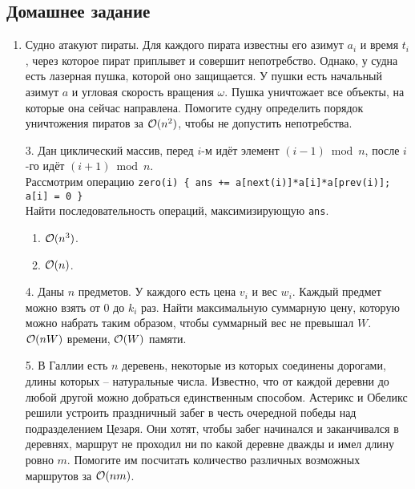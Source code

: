 \subsection{Домашнее задание}
\begin{enumerate}
  \item {}
    Судно атакуют пираты. Для каждого пирата известны его азимут $a_i$
    и время $t_i$, через которое пират приплывет и совершит
    непотребство. Однако, у судна есть лазерная пушка, которой оно
    защищается. У пушки есть начальный азимут $a$ и угловая скорость
    вращения $\omega$. Пушка уничтожает все объекты, на которые она
    сейчас направлена. Помогите судну определить порядок уничтожения
    пиратов за $\mathcal{O}(n^2)$, чтобы не допустить непотребства.


  \item[3.]
    Дан циклический массив, перед $i$-м идёт элемент $(i{-}1) \bmod n$,
    после $i$-го идёт $(i{+}1) \bmod n$. \\
    Рассмотрим операцию \texttt{zero(i) \{ ans += a[next(i)]*a[i]*a[prev(i)]; a[i] = 0 \}}\\
    Найти последовательность операций, максимизирующую \texttt{ans}.
    \begin{enumerate}
      \item $\mathcal{O}(n^3)$.
      \item $\mathcal{O}(n)$.
    \end{enumerate}

  \item[4.]
    Даны $n$ предметов. У каждого есть цена $v_i$ и вес $w_i$. Каждый предмет можно взять
    от $0$ до $k_i$ раз. Найти максимальную суммарную цену,
    которую можно набрать таким образом, чтобы суммарный вес не превышал $W$.
    $\mathcal{O}(nW)$ времени, $\mathcal{O}(W)$ памяти.

  \item[5.] 
    В Галлии есть $n$ деревень, некоторые из которых соединены дорогами, длины которых --
    натуральные числа. Известно, что от каждой деревни до любой другой можно добраться
    единственным способом. Астерикс и Обеликс решили устроить праздничный забег в честь
    очередной победы над подразделением Цезаря. Они хотят, чтобы забег начинался и заканчивался
    в деревнях, маршрут не проходил ни по какой деревне дважды и имел длину ровно $m$.
    Помогите им посчитать количество различных возможных маршрутов за $\mathcal{O}(nm)$.


\end{enumerate}
